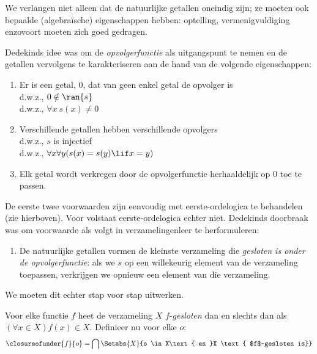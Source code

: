 \documentclass[../../../include/open-logic-section]{subfiles}
\begin{document}

We verlangen niet alleen dat de natuurlijke getallen oneindig zijn;
ze moeten ook bepaalde (algebraïsche) eigenschappen hebben: optelling,
vermenigvuldiging enzovoort moeten zich goed gedragen.

Dedekinds idee was om de \emph{opvolgerfunctie} als uitgangspunt te
nemen en de getallen vervolgens te karakteriseren aan de hand van de
volgende eigenschappen:
\begin{enumerate}
	\item Er is een getal, $0$, dat van geen enkel getal de opvolger is
	\\d.w.z., $0 \notin \ran{s}$
	\\d.w.z., $\forall x\ s(x) \neq 0$
	\item Verschillende getallen hebben verschillende opvolgers
	\\d.w.z., $s$ is injectief
	\\d.w.z., $\forall x \forall y (s(x) = s(y) \lif x = y)$
	\item{} Elk getal wordt verkregen door de
	opvolgerfunctie herhaaldelijk op $0$ toe te passen.
\end{enumerate}
De eerste twee voorwaarden zijn eenvoudig met eerste-ordelogica te
behandelen (zie hierboven). Voor  volstaat
eerste-ordelogica echter niet. Dedekinds doorbraak was om voorwaarde
 als volgt in verzamelingenleer te
herformuleren:
\begin{enumerate}
	\item[3$'$.] De natuurlijke getallen vormen de kleinste verzameling
	die \emph{gesloten is onder de opvolgerfunctie}: als we $s$ op een
	willekeurig element van de verzameling toepassen, verkrijgen we
	opnieuw een element van die verzameling.
\end{enumerate}
We moeten dit echter stap voor stap uitwerken.

\begin{defn}
	Voor elke functie $f$ heet de verzameling $X$ $f$-\emph{gesloten}
	{dan en slechts dan als} $(\forall x \in X)f(x) \in X$. Definieer
	nu voor elke $o$:
	$$\closureofunder{f}{o} = \bigcap\Setabs{X}{o \in X\text{ en }X
\text{ $f$-gesloten is}}$$
\end{defn}
\end{document}
